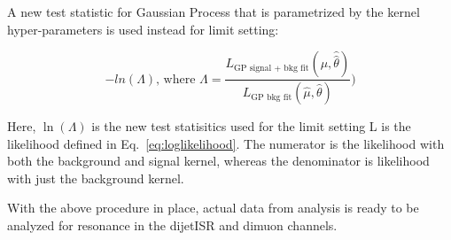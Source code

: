     A new test statistic for Gaussian Process that is parametrized by the kernel hyper-parameters is used instead for limit setting:

\begin{equation}
    -ln(\Lambda) \textrm{, where }\Lambda= \frac{L_{\textrm{GP signal + bkg fit}}(\mu, \hat{\hat{\theta}})}{L_{\textrm{GP bkg fit}}(\hat{\mu}, \hat{\theta})})
\label{eq:gplikelihood}
\end{equation}

Here, $\ln(\Lambda)$ is the new test statisitics used for the limit setting L is the likelihood defined in Eq.~\ref{eq:loglikelihood}. The numerator is the likelihood with both the background and signal kernel, whereas the denominator is likelihood with just the background kernel. 

With the above procedure in place, actual data from analysis is ready to be analyzed for resonance in the dijetISR and dimuon channels.

